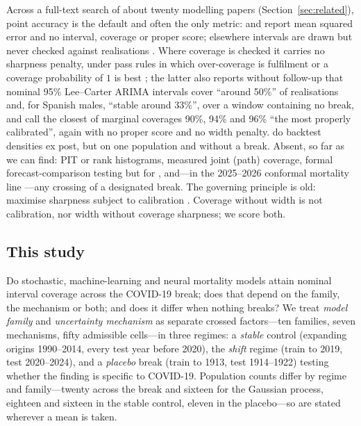 Across a full-text search of about twenty modelling papers
(Section~\ref{sec:related}), point accuracy is the default and often the
only metric: \citet{richman2021neural} and
\citep{scognamiglio2022calibrating,nigri2019deep,petnehazi2019mortality,perla2021time}
report mean squared error and no interval, coverage or proper score;
elsewhere intervals are drawn but never checked against realisations
\citep{miyata2022extending}. Where coverage is checked it carries no
sharpness penalty, under pass rules in which over-coverage is fulfilment
\citep{schnurch2022point} or a coverage probability of $1$ is best
\citep{marino2023neural}; the latter also reports without follow-up that
nominal 95\% Lee--Carter ARIMA intervals cover ``around 50\%'' of realisations
and, for Spanish
males, ``stable around 33\%'', over a window containing no break, and
\citet{miao2025gradient} call the closest of marginal coverages 90\%, 94\%
and 96\% ``the most properly calibrated'', again with no proper score and no
width penalty. \citet{dowd2010backtesting} do backtest densities ex post,
but on one population and without a break. Absent, so far as we can find:
PIT or rank histograms, measured joint (path) coverage, formal
forecast-comparison testing but for \citet{shang2018model}, and---in the
2025--2026 conformal mortality line
\citep{shang2025intervals,shang2026conformal,shang2026subnational}---any
crossing of a designated break. The governing principle is old: maximise
sharpness subject to calibration
\citep{gneiting2007probabilistic,gneiting2007strictly}. Coverage without
width is not calibration, nor width without coverage sharpness; we score
both.

\subsection{This study}

Do stochastic, machine-learning and neural mortality models attain nominal
interval coverage across the COVID-19 break; does that depend on the
family, the mechanism or both; and does it differ when nothing breaks? We
treat \emph{model family} and \emph{uncertainty mechanism} as separate crossed
factors---ten families, seven mechanisms,
fifty admissible cells---in three regimes: a \emph{stable} control
(expanding origins 1990--2014, every test year before 2020), the
\emph{shift} regime (train to 2019, test 2020--2024), and a \emph{placebo}
break (train to 1913, test 1914--1922) testing whether the finding is
specific to COVID-19. Population counts differ by regime and family---twenty
across the break and sixteen for the Gaussian process, eighteen and sixteen
in the stable control, eleven in the placebo---so are stated wherever a mean
is taken.

